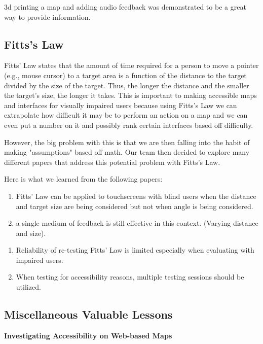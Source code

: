 \documentclass{article}
\begin{document}
\cite{10.1145/3186894}
3d printing a map and adding audio feedback was demonstrated to be a great way to provide information.



\subsection{Fitts's Law}
Fitts' Law states that the amount of time required for a person to move a pointer (e.g., mouse cursor) to a target area is a function of the distance to the target divided by the size of the target. Thus, the longer the distance and the smaller the target's size, the longer it takes. This is important to making accessible maps and interfaces for visually impaired users because using Fitts's Law we can extrapolate how difficult it may be to perform an action on a map and we can even put a number on it and possibly rank certain interfaces based off difficulty.
\newline
\par However, the big problem with this is that we are then falling into the habit of making "assumptions" based off math. Our team then decided to explore many different papers that address this potential problem with Fitts's Law.
\newline
\par Here is what we learned from the following papers:

\cite{LAHIB201816}
\begin{enumerate}
    \item Fitts' Law can be applied to touchscreens with blind users when the distance and target size are being considered but not when angle is being considered. 
    \item a single medium of feedback is still effective in this context. (Varying distance and size).
\end{enumerate}

\cite{10.1145/3373625.3416999}
\begin{enumerate}
    \item Reliability of re-testing Fitts' Law is limited especially when evaluating with impaired users. 
    \item When testing for accessibility reasons, multiple testing sessions should be utilized. 
\end{enumerate}

\subsection{Miscellaneous Valuable Lessons}
\cite{10.1145/2815169.2815171} \textbf{Investigating Accessibility on Web-based Maps } 
\end{document}
